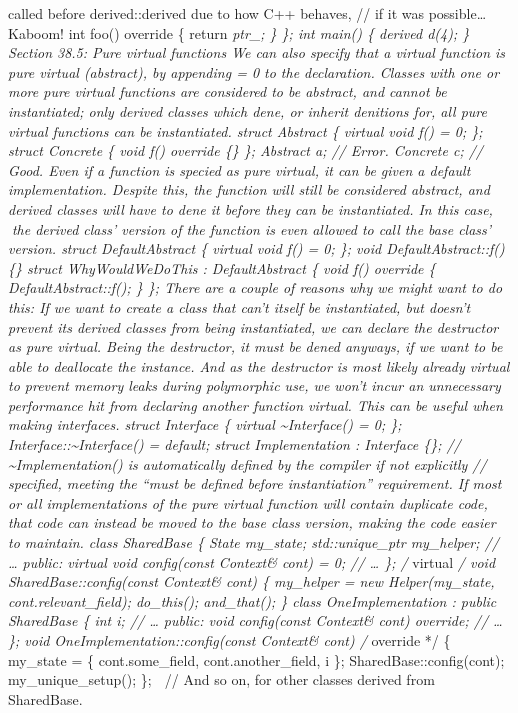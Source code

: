 called before derived::derived due to how C++ behaves, // if it was
possible\ldots{} Kaboom! int foo() override \{ return \emph{ptr\_; \}
\}; int main() \{ derived d(4); \} Section 38.5: Pure virtual functions
We can also specify that a virtual function is pure virtual (abstract),
by appending = 0 to the declaration. Classes with one or more pure
virtual functions are considered to be abstract, and cannot be
instantiated; only derived classes which dene, or inherit denitions for,
all pure virtual functions can be instantiated. struct Abstract \{
virtual void f() = 0; \}; struct Concrete \{ void f() override \{\} \};
Abstract a; // Error. Concrete c; // Good. Even if a function is specied
as pure virtual, it can be given a default implementation. Despite this,
the function will still be considered abstract, and derived classes will
have to dene it before they can be instantiated. In this case, the
derived class' version of the function is even allowed to call the base
class' version. struct DefaultAbstract \{ virtual void f() = 0; \}; void
DefaultAbstract::f() \{\} struct WhyWouldWeDoThis : DefaultAbstract \{
void f() override \{ DefaultAbstract::f(); \} \}; There are a couple of
reasons why we might want to do this: If we want to create a class that
can't itself be instantiated, but doesn't prevent its derived classes
from being instantiated, we can declare the destructor as pure virtual.
Being the destructor, it must be dened anyways, if we want to be able to
deallocate the instance. And as the destructor is most likely already
virtual to prevent memory leaks during polymorphic use, we won't incur
an unnecessary performance hit from declaring another function virtual.
This can be useful when making interfaces. struct Interface \{ virtual
\textasciitilde Interface() = 0; \};
Interface::\textasciitilde Interface() = default; struct Implementation
: Interface \{\}; // \textasciitilde Implementation() is automatically
defined by the compiler if not explicitly // specified, meeting the
``must be defined before instantiation'' requirement. If most or all
implementations of the pure virtual function will contain duplicate
code, that code can instead be moved to the base class version, making
the code easier to maintain. class SharedBase \{ State my\_state;
std::unique\_ptr my\_helper; // \ldots{} public: virtual void
config(const Context\& cont) = 0; // \ldots{} \}; /} virtual \emph{/
void SharedBase::config(const Context\& cont) \{ my\_helper = new
Helper(my\_state, cont.relevant\_field); do\_this(); and\_that(); \}
class OneImplementation : public SharedBase \{ int i; // \ldots{}
public: void config(const Context\& cont) override; // \ldots{} \}; void
OneImplementation::config(const Context\& cont) /} override */ \{
my\_state = \{ cont.some\_field, cont.another\_field, i \};
SharedBase::config(cont); my\_unique\_setup(); \};  // And so on, for
other classes derived from SharedBase.

